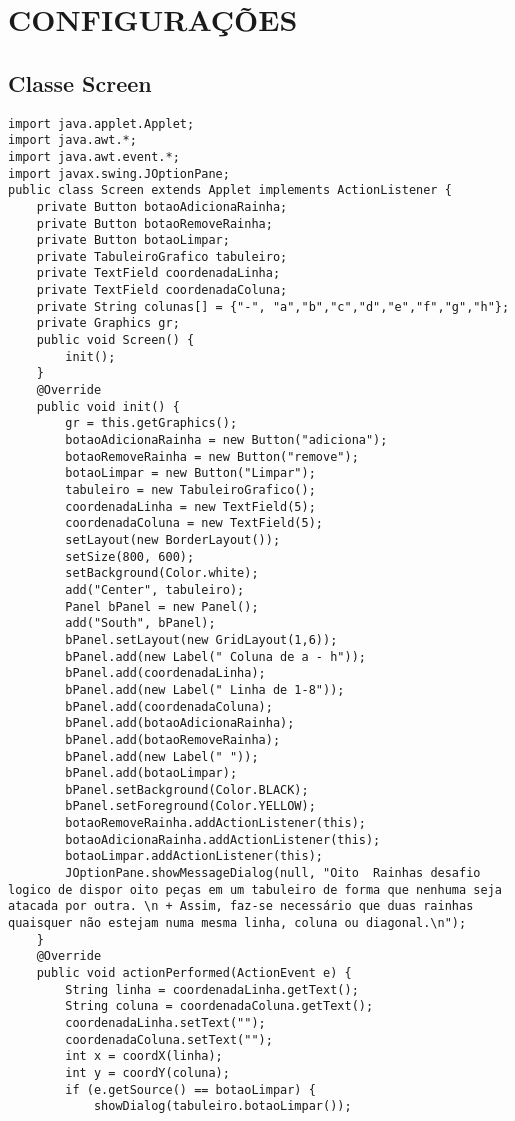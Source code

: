 \chapter{CONFIGURAÇÕES}
\section{Classe Screen}

\begin{lstlisting}
import java.applet.Applet;
import java.awt.*;
import java.awt.event.*;
import javax.swing.JOptionPane;
public class Screen extends Applet implements ActionListener {
    private Button botaoAdicionaRainha;
    private Button botaoRemoveRainha;
    private Button botaoLimpar;
	private TabuleiroGrafico tabuleiro;    
    private TextField coordenadaLinha;
    private TextField coordenadaColuna;
    private String colunas[] = {"-", "a","b","c","d","e","f","g","h"};
    private Graphics gr;
    public void Screen() {
        init();
    }
    @Override 
    public void init() {
        gr = this.getGraphics();
        botaoAdicionaRainha = new Button("adiciona");
        botaoRemoveRainha = new Button("remove");
        botaoLimpar = new Button("Limpar");
        tabuleiro = new TabuleiroGrafico();
        coordenadaLinha = new TextField(5);
        coordenadaColuna = new TextField(5);  
        setLayout(new BorderLayout());
        setSize(800, 600);
        setBackground(Color.white);
        add("Center", tabuleiro);   
        Panel bPanel = new Panel();
        add("South", bPanel);  
        bPanel.setLayout(new GridLayout(1,6));
        bPanel.add(new Label(" Coluna de a - h"));
        bPanel.add(coordenadaLinha);    
        bPanel.add(new Label(" Linha de 1-8"));
        bPanel.add(coordenadaColuna);   
        bPanel.add(botaoAdicionaRainha);
        bPanel.add(botaoRemoveRainha);
        bPanel.add(new Label(" "));
        bPanel.add(botaoLimpar);
        bPanel.setBackground(Color.BLACK);
        bPanel.setForeground(Color.YELLOW);
        botaoRemoveRainha.addActionListener(this);
        botaoAdicionaRainha.addActionListener(this);
        botaoLimpar.addActionListener(this);
        JOptionPane.showMessageDialog(null, "Oito  Rainhas desafio logico de dispor oito peças em um tabuleiro de forma que nenhuma seja atacada por outra. \n + Assim, faz-se necessário que duas rainhas quaisquer não estejam numa mesma linha, coluna ou diagonal.\n");        
    }
    @Override
    public void actionPerformed(ActionEvent e) { 
        String linha = coordenadaLinha.getText();
        String coluna = coordenadaColuna.getText();
        coordenadaLinha.setText("");
        coordenadaColuna.setText(""); 
        int x = coordX(linha);
        int y = coordY(coluna);
        if (e.getSource() == botaoLimpar) { 
            showDialog(tabuleiro.botaoLimpar());
            

\end{lstlisting}
